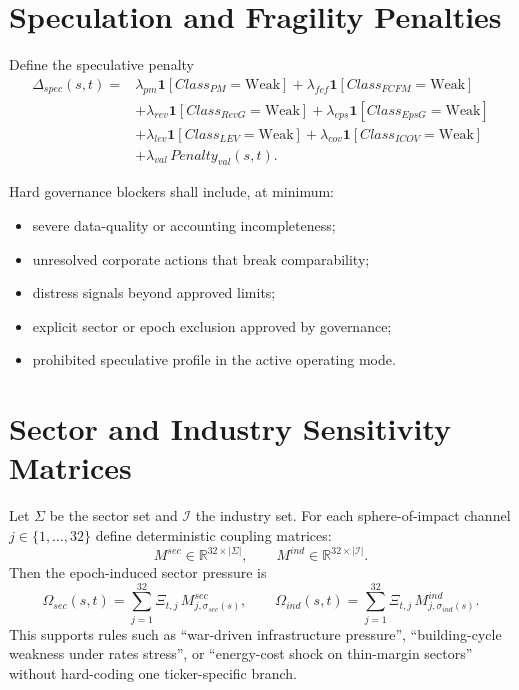 \section{Speculation and Fragility Penalties}

Define the speculative penalty
\begin{align*}
\Delta_{spec}(s,t)=&\lambda_{pm}\mathbf{1}[Class_{PM}=\text{Weak}]
+\lambda_{fcf}\mathbf{1}[Class_{FCFM}=\text{Weak}] \\
&+\lambda_{rev}\mathbf{1}[Class_{RevG}=\text{Weak}]
+\lambda_{eps}\mathbf{1}[Class_{EpsG}=\text{Weak}] \\
&+\lambda_{lev}\mathbf{1}[Class_{LEV}=\text{Weak}]
+\lambda_{cov}\mathbf{1}[Class_{ICOV}=\text{Weak}] \\
&+\lambda_{val}\,Penalty_{val}(s,t).
\end{align*}

Hard governance blockers shall include, at minimum:
\begin{itemize}
\item severe data-quality or accounting incompleteness;
\item unresolved corporate actions that break comparability;
\item distress signals beyond approved limits;
\item explicit sector or epoch exclusion approved by governance;
\item prohibited speculative profile in the active operating mode.
\end{itemize}

\section{Sector and Industry Sensitivity Matrices}

Let $\Sigma$ be the sector set and $\mathcal{I}$ the industry set. For each sphere-of-impact channel $j\in\{1,\dots,32\}$ define deterministic coupling matrices:
\[
M^{sec}\in\mathbb{R}^{32\times |\Sigma|},\qquad M^{ind}\in\mathbb{R}^{32\times |\mathcal{I}|}.
\]
Then the epoch-induced sector pressure is
\[
\Omega_{sec}(s,t)=\sum_{j=1}^{32}\Xi_{t,j}\,M^{sec}_{j,\sigma_{sec}(s)},
\qquad
\Omega_{ind}(s,t)=\sum_{j=1}^{32}\Xi_{t,j}\,M^{ind}_{j,\sigma_{ind}(s)}.
\]
This supports rules such as ``war-driven infrastructure pressure'', ``building-cycle weakness under rates stress'', or ``energy-cost shock on thin-margin sectors'' without hard-coding one ticker-specific branch.


